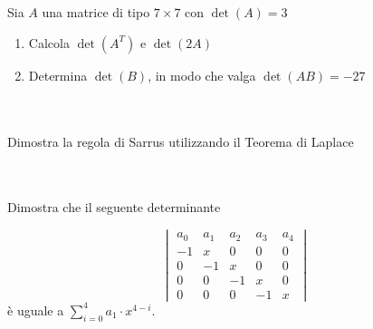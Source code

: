 \documentclass[a4paper,10pt]{article}
\begin{document}




\bigskip



 \\\\
    Sia $A$ una matrice di tipo $7 \times 7$ con $\det(A)=3$
    \begin{enumerate}
        \item Calcola $\det(A^{T})$ e $\det(2A)$
        \item Determina $\det(B)$, in modo che valga $\det(AB) = -27$
    \end{enumerate}



\bigskip



 \\\\
    Dimostra la regola di Sarrus utilizzando il Teorema di Laplace



\pagebreak


 \\\\
    Dimostra che il seguente determinante

        $$ 
        \begin{vmatrix}
            a_{0} & a_{1} & a_{2} & a_{3} & a_{4} \\
            -1 & x & 0 & 0 & 0 \\
            0 & -1 & x & 0 & 0 \\
            0 & 0 & -1 & x & 0 \\
            0 & 0 & 0 & -1 & x 
        \end{vmatrix}
        $$
    è uguale a $\displaystyle\sum\limits_{i=0}^{4}{a_{1} \cdot x^{4-i}}$.

\end{document}
